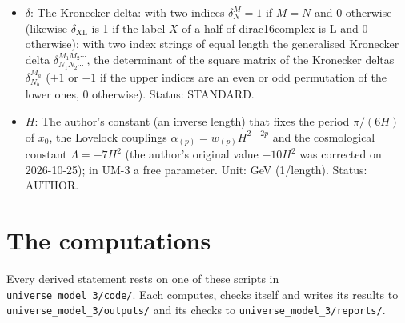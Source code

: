 \documentclass[
  10pt,
]{article}
\begin{document}
\begin{itemize}
  the static block is a vacuum (its Lovelock tensors add to \(7H^2\) in
  every direction). The author's original value was \(\Lambda = -10H^2\)
  (he writes the pure number \(\Lambda_{\mathrm{N}} = 10\) in
  \(0 = -\Lambda_{\mathrm{N}} + \sum_p H^{-2p}w_{(p)}\mathcal{E}_{(p)}\)).
  Unit: GeV\(^2\). Value: \(-7H^2\); the author's original \(-10H^2\).
  Status: AUTHOR (the term), DERIVED (the value).
\item
  \(\delta\): The Kronecker delta: with two indices \(\delta^M_N = 1\)
  if \(M = N\) and 0 otherwise (likewise \(\delta_{X\mathrm{L}}\) is 1
  if the label \(X\) of a half of dirac16complex is L and 0 otherwise);
  with two index strings of equal length the generalised Kronecker delta
  \(\delta^{M_1M_2\cdots}_{N_1N_2\cdots}\), the determinant of the
  square matrix of the Kronecker deltas \(\delta^{M_a}_{N_b}\) (\(+1\)
  or \(-1\) if the upper indices are an even or odd permutation of the
  lower ones, 0 otherwise). Status: STANDARD.
\item
  \(H\): The author's constant (an inverse length) that fixes the period
  \(\pi/(6H)\) of \(x_0\), the Lovelock couplings
  \(\alpha_{(p)} = w_{(p)}H^{2-2p}\) and the cosmological constant
  \(\Lambda = -7H^2\) (the author's original value \(-10H^2\) was
  corrected on 2026-10-25); in UM-3 a free parameter. Unit: GeV
  (1/length). Status: AUTHOR.
\end{itemize}

\hypertarget{the-computations}{%
\section{The computations}\label{the-computations}}

Every derived statement rests on one of these scripts in
\texttt{universe\_model\_3/code/}. Each computes, checks itself and
writes its results to \texttt{universe\_model\_3/outputs/} and its
checks to \texttt{universe\_model\_3/reports/}.
\end{document}
